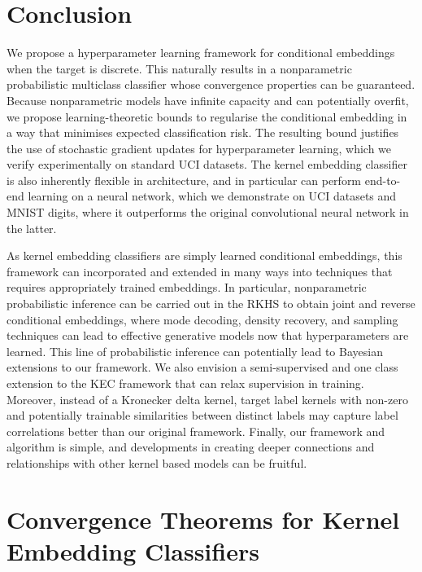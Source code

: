 \documentclass{article}
\begin{document}
\section{Conclusion}
	
	We propose a hyperparameter learning framework for conditional embeddings when the target is discrete. This naturally results in a nonparametric probabilistic multiclass classifier whose convergence properties can be guaranteed. Because nonparametric models have infinite capacity and can potentially overfit, we propose learning-theoretic bounds to regularise the conditional embedding in a way that minimises expected classification risk. The resulting bound justifies the use of stochastic gradient updates for hyperparameter learning, which we verify experimentally on standard UCI datasets. The kernel embedding classifier is also inherently flexible in architecture, and in particular can perform end-to-end learning on a neural network, which we demonstrate on UCI datasets and MNIST digits, where it outperforms the original convolutional neural network in the latter.
	
	As kernel embedding classifiers are simply learned conditional embeddings, this framework can incorporated and extended in many ways into techniques that requires appropriately trained embeddings. In particular, nonparametric probabilistic inference can be carried out in the RKHS to obtain joint and reverse conditional embeddings, where mode decoding, density recovery, and sampling techniques can lead to effective generative models now that hyperparameters are learned. This line of probabilistic inference can potentially lead to Bayesian extensions to our framework. We also envision a semi-supervised and one class extension to the KEC framework that can relax supervision in training. Moreover, instead of a Kronecker delta kernel, target label kernels with non-zero and potentially trainable similarities between distinct labels may capture label correlations better than our original framework. Finally, our framework and algorithm is simple, and developments in creating deeper connections and relationships with other kernel based models can be fruitful. 

\newpage



\newpage
\appendix
	
\section{Convergence Theorems for Kernel Embedding Classifiers}
\label{app:convergence_theorems}
\end{document}
